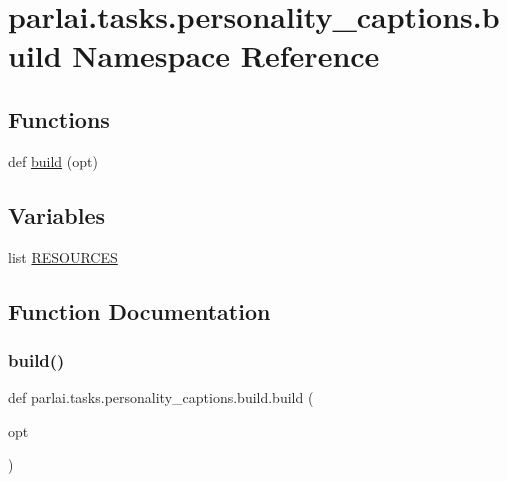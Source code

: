 \hypertarget{namespaceparlai_1_1tasks_1_1personality__captions_1_1build}{}\section{parlai.\+tasks.\+personality\+\_\+captions.\+build Namespace Reference}
\label{namespaceparlai_1_1tasks_1_1personality__captions_1_1build}
\subsection*{Functions}
\begin{DoxyCompactItemize}
\item 
def \hyperlink{namespaceparlai_1_1tasks_1_1personality__captions_1_1build_a74a7207f7a37bbac7c1f1b17bb5a2080}{build} (opt)
\end{DoxyCompactItemize}
\subsection*{Variables}
\begin{DoxyCompactItemize}
\item 
list \hyperlink{namespaceparlai_1_1tasks_1_1personality__captions_1_1build_a43edf9dfd08f6790032bd085b1e83af5}{R\+E\+S\+O\+U\+R\+C\+ES}
\end{DoxyCompactItemize}


\subsection{Function Documentation}
\mbox{\label{namespaceparlai_1_1tasks_1_1personality__captions_1_1build_a74a7207f7a37bbac7c1f1b17bb5a2080}} 
\subsubsection{\texorpdfstring{build()}{build()}}
{\footnotesize\ttfamily def parlai.\+tasks.\+personality\+\_\+captions.\+build.\+build (\begin{DoxyParamCaption}\item[{}]{opt }\end{DoxyParamCaption})}



